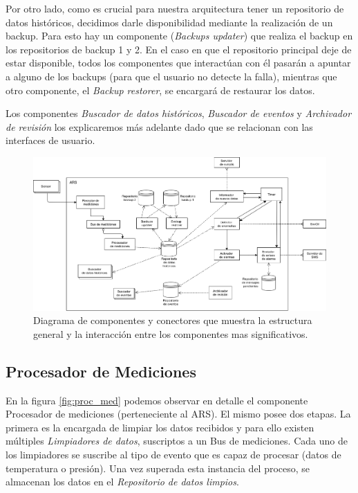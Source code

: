 \par Por otro lado, como es crucial para nuestra arquitectura tener un repositorio de datos históricos, decidimos darle disponibilidad mediante la realización de un backup. Para esto hay un componente (\textit{Backups updater}) que realiza el backup en los repositorios de backup 1 y 2. En el caso en que el repositorio principal deje de estar disponible, todos los componentes que interactúan con él pasarán a apuntar a alguno de los backups (para que el usuario no detecte la falla), mientras que otro componente, el \textit{Backup restorer}, se encargará de restaurar los datos. \\

\par Los componentes \textit{Buscador de datos históricos}, \textit{Buscador de eventos} y \textit{Archivador de revisión} los explicaremos más adelante dado que se relacionan con las interfaces de usuario.

\newpage
\begin{figure}[H]
  \centering
  \includegraphics[angle=-90,scale=0.52]{imagenes/diagramas/core.png}
  \caption{Diagrama de componentes y conectores que muestra la estructura general y la interacción entre los componentes mas significativos.}
  \label{fig:dia_cyc_core}
\end{figure}
\newpage

\subsection{Procesador de Mediciones}

En la figura \ref{fig:proc_med} podemos observar en detalle el componente Procesador de mediciones (perteneciente al ARS). El mismo posee dos etapas. La primera es la encargada de limpiar los datos recibidos y para ello existen múltiples \textit{Limpiadores de datos}, suscriptos a un Bus de mediciones. Cada uno de los limpiadores se suscribe al tipo de evento que es capaz de procesar (datos de temperatura o presión). Una vez superada esta instancia del proceso, se almacenan los datos en el \textit{Repositorio de datos limpios}. \\

